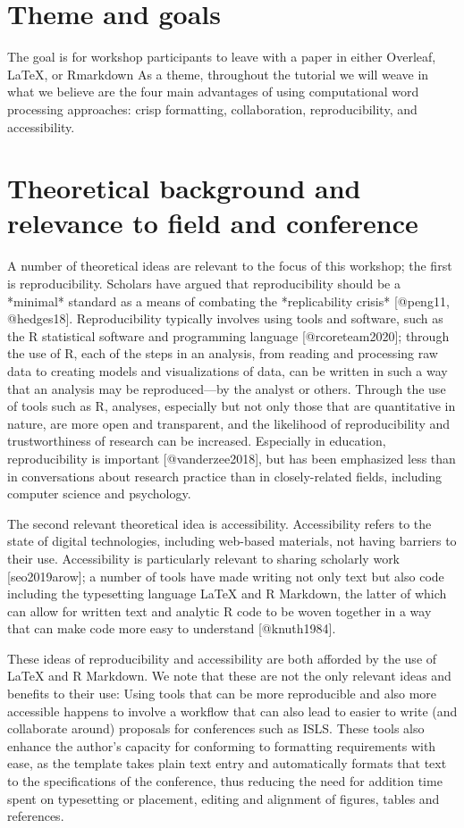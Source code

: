 \documentclass{article}
\begin{document}
\section{Theme and goals}
The goal is for workshop participants to leave with a paper in either Overleaf, LaTeX, or Rmarkdown
As a theme, throughout the tutorial we will weave in what we believe are the four main advantages of using computational word processing approaches: crisp formatting, collaboration, reproducibility, and accessibility.

\section{Theoretical background and relevance to field and conference}

A number of theoretical ideas are relevant to the focus of this workshop;
the first is reproducibility. Scholars have argued that reproducibility should
be a *minimal* standard as a means of combating the *replicability crisis* [@peng11, @hedges18]. 
Reproducibility typically involves using tools and software, such as the R 
statistical software and programming language [@rcoreteam2020]; through the use of 
R, each of the steps in an analysis, from reading and processing raw data to creating
models and visualizations of data, can be written in such a way that an analysis
may be reproduced---by the analyst or others. Through the use of tools such as R, 
analyses, especially but not only those that are quantitative in nature, are more
open and transparent, and the likelihood of reproducibility and trustworthiness
of research can be increased. Especially in education, reproducibility is 
important [@vanderzee2018], but has been emphasized less than in conversations about 
research practice than in closely-related fields, including computer science and psychology.

The second relevant theoretical idea is accessibility. Accessibility refers to 
the state of digital technologies, including web-based materials, not having barriers
to their use. Accessibility is particularly relevant to sharing scholarly work [seo2019arow];
a number of tools have made writing not only text but also code including the typesetting 
language LaTeX and R Markdown,  the latter of which can allow for written text and analytic 
R code to be woven together in a way that can make code more easy to understand [@knuth1984].

These ideas of reproducibility and accessibility are both afforded by the use of LaTeX and
R Markdown. We note that these are not the only relevant ideas and benefits to their use:
Using tools that can be more reproducible and also more accessible happens to involve a workflow
that can also lead to easier to write (and collaborate around) proposals for conferences such as ISLS. These tools also enhance the author's capacity for conforming to formatting requirements with ease, as the template takes plain text entry and automatically formats that text to the specifications of the conference, thus reducing the need for addition time spent on typesetting or placement, editing and alignment of figures, tables and references. 
\end{document}
